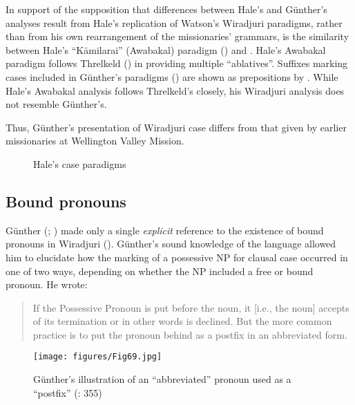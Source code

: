 In support of the supposition that differences between Hale’s and Günther’s analyses result from Hale’s replication of Watson’s Wiradjuri paradigms, rather than from his own rearrangement of the missionaries' grammars, is the similarity between Hale’s “Kāmilarai” (Awabakal) paradigm (\citeyear[486]{hale_languages_1846}) and . Hale’s Awabakal paradigm follows Threlkeld () in providing multiple ``ablatives''. Suffixes marking cases included in Günther’s paradigms () are shown as prepositions by \citet[492]{hale_languages_1846}. While Hale’s Awabakal analysis follows Threlkeld’s closely, his Wiradjuri analysis does not resemble Günther’s. 

Thus, Günther’s presentation of Wiradjuri case differs from that given by earlier missionaries at Wellington Valley Mission.

\begin{figure}
\caption{Hale's  case paradigms}
\end{figure}
	
\subsection{Bound pronouns}
\label{sec:key:4.4.6}

Günther (\citeyear{gunther_native_1838}; \citeyear{gunther_lecture_1840}) made only a single \textit{explicit} reference to the existence of bound pronouns in Wiradjuri (). Günther’s sound knowledge of the language allowed him to elucidate how the marking of a possessive NP for clausal case occurred in one of two ways, depending on whether the NP included a free or bound pronoun. He wrote:

\begin{quote}
    If the Possessive Pronoun is put before the noun, it [i.e., the noun] accepts of its termination or in other words is declined. But the more common practice is to put the pronoun behind as a postfix in an abbreviated form. \citep[355]{gunther_lecture_1840}
\end{quote}

\begin{figure}
\texttt{[image: figures/Fig69.jpg]}
\caption{Günther’s illustration of an “abbreviated” pronoun used as a “postfix” (\citeyear{gunther_lecture_1840}: 355)}
\label{fig:4:69}
\end{figure}

